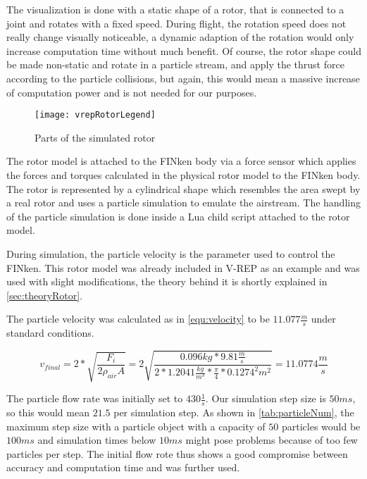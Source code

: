The visualization is done with a static shape of a rotor, that is connected to a joint and rotates with a fixed speed. 
During flight, the rotation speed does not really change visually noticeable, a dynamic adaption of the rotation would only increase computation time without much benefit. 
Of course, the rotor shape could be made non-static and rotate in a particle stream, and apply the thrust force according to the particle collisions, but again, this would mean a massive increase of computation power and is not needed for our purposes.

\begin{figure}[h!]
 \begin{center}
  \texttt{[image: vrepRotorLegend]}
 \end{center}
  \caption{Parts of the simulated rotor \label{fig:vrepRotor}}
\end{figure}


The rotor model is attached to the FINken body via a force sensor which applies the forces and torques calculated in the physical rotor model to the FINken body. 
The rotor is represented by a cylindrical shape which resembles the area swept by a real rotor and uses a particle simulation to emulate the airstream. The handling of the particle simulation is done inside a Lua child script attached to the rotor model.
 
 
During simulation, the particle velocity is the parameter used to control the FINken. This rotor model was already included in V-REP as an example and was used with slight  modifications, the theory behind it is shortly explained in \ref{sec:theoryRotor}. 

The particle velocity was calculated as in \ref{equ:velocity} to be $11.077 \frac{m}{s}$ under standard conditions.

 \begin{equation}
    v_{final}= 2 * \sqrt{\frac{ F_i}{2 \rho_{air} A}} = 2 \sqrt{\frac{ 0.096 kg * 9.81 \frac{m}{s}}{2 * 1.2041 \frac{kg}{m^3} * \frac{\pi}{4} * 0.1274^2 m^2}} = 11.0774 \frac{m}{s}
    \label{equ:velocity}
 \end{equation}
 
 
    
    The particle flow rate was initially set to $430 \frac{1}{s}$. 
    Our simulation step size is $50 ms$, so this would mean $21.5$ per simulation step. 
    As shown in \ref{tab:particleNum}, the maximum step size with a particle object with a capacity of $50$ particles would be $100 ms$ and simulation times below $10 ms$ might pose problems because of too few particles per step. 
   The initial flow rote thus shows a good compromise between accuracy and computation time and was further used.
    
